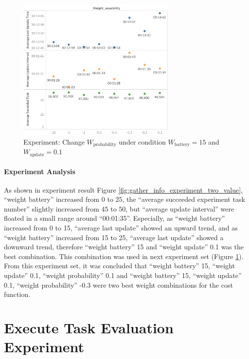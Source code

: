 \begin{figure}[htbp]
 \centering
 \includegraphics[width = 0.7\textwidth]{content/images/ch5/gather_info_change_weight_probability_only.png}
 \caption{Experiment: Change $W_{\mbox{probability}}$ under condition $W_{\mbox{battery}}=15$ and $ W_{\mbox{update}}=0.1$}
 \label{fig:gather_info_experiment_three_value}
\end{figure}

\paragraph{Experiment Analysis} 
As shown in experiment result Figure \ref{fig:gather_info_experiment_two_value}, ``weight battery'' increased from 0 to 25, the ``average succeeded experiment task number'' slightly increased from 45 to 50, but ``average update interval'' were floated in a small range around ``00:01:35''. Especially, as ``weight battery'' increased from 0 to 15, ``average last update'' showed an upward trend, and as ``weight battery'' increased from 15 to 25, ``average last update'' showed a downward trend, 
therefore ``weight battery'' 15 and ``weight update'' 0.1 was the best combination. 
This combination was used in next experiment set (Figure \ref{fig:gather_info_experiment_three_value}). From this experiment set, it was concluded that ``weight battery'' 15, ``weight update'' 0.1, ``weight probability'' 0.1 and ``weight battery'' 15, ``weight update'' 0.1, ``weight probability'' -0.3 were two best weight combinations for the cost function.

\section{Execute Task Evaluation Experiment}
\label{sec:execute_task_experiments}


